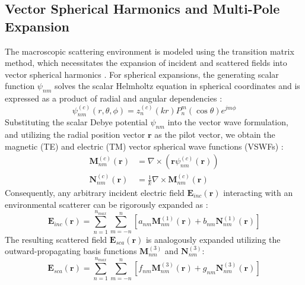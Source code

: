 \documentclass[11pt,a4paper]{article}
\begin{document}
\subsection{Vector Spherical Harmonics and Multi-Pole Expansion} \label{subsec:vsh}
The macroscopic scattering environment is modeled using the transition matrix method, which necessitates the expansion of incident and scattered fields into vector spherical harmonics \cite{waterman1965matrix, mishchenko2002scattering}. For spherical expansions, the generating scalar function $\psi_{nm}$ solves the scalar Helmholtz equation in spherical coordinates and is expressed as a product of radial and angular dependencies \cite{jackson1999classical}:
\begin{equation}
    \psi_{nm}^{(c)}(r, \theta, \phi) = z_n^{(c)}(kr) P_n^m(\cos\theta) e^{jm\phi} \label{eq:scalar_spherical}
\end{equation}
Substituting the scalar Debye potential $\psi_{nm}$ into the vector wave formulation, and utilizing the radial position vector $\mathbf{r}$ as the pilot vector, we obtain the magnetic (TE) and electric (TM) vector spherical wave functions (VSWFs) \cite{mishchenko1996tmatrix}:
\begin{align}
    \mathbf{M}_{nm}^{(c)}(\mathbf{r}) &= \nabla \times \left( \mathbf{r} \psi_{nm}^{(c)}(\mathbf{r}) \right) \label{eq:M_spherical} \\
    \mathbf{N}_{nm}^{(c)}(\mathbf{r}) &= \frac{1}{k} \nabla \times \mathbf{M}_{nm}^{(c)}(\mathbf{r}) \label{eq:N_spherical}
\end{align}
Consequently, any arbitrary incident electric field $\mathbf{E}_{inc}(\mathbf{r})$ interacting with an environmental scatterer can be rigorously expanded as \cite{waterman1965matrix}:
\begin{equation}
    \mathbf{E}_{inc}(\mathbf{r}) = \sum_{n=1}^{n_{max}} \sum_{m=-n}^{n} \left[ a_{nm}\mathbf{M}_{nm}^{(1)}(\mathbf{r}) + b_{nm}\mathbf{N}_{nm}^{(1)}(\mathbf{r}) \right] \label{eq:E_inc_expansion}
\end{equation}
The resulting scattered field $\mathbf{E}_{sca}(\mathbf{r})$ is analogously expanded utilizing the outward-propagating basis functions $\mathbf{M}_{nm}^{(3)}$ and $\mathbf{N}_{nm}^{(3)}$:
\begin{equation}
    \mathbf{E}_{sca}(\mathbf{r}) = \sum_{n=1}^{n_{max}} \sum_{m=-n}^{n} \left[ f_{nm}\mathbf{M}_{nm}^{(3)}(\mathbf{r}) + g_{nm}\mathbf{N}_{nm}^{(3)}(\mathbf{r}) \right] \label{eq:E_sca_expansion}
\end{equation}
\end{document}
